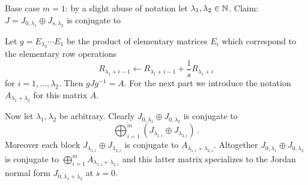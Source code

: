 \documentclass[draft]{article}
\begin{document}
\begin{itemize}
    \begin{remark}
        Base case $m = 1$: by a slight abuse of notation let $\lambda_1, \lambda_2 \in \mathbb N$. Claim: $J=J_{0,\lambda_1} \oplus J_{s,\lambda_2}$ is conjugate to 
        
\begin{comment}
\[
        A = \begin{bNiceArray}{ccc|ccc}[columns-width = auto,first-row,last-col,code-for-first-row = \color{blue}\scriptstyle\rotate,code-for-last-col = \color{blue}\scriptstyle,nullify-dots,xdots/line-style=loosely dotted]
        1 & \Cdots & \lambda_1 & \lambda_1 + 1 & \Cdots & \lambda_1 + \lambda_2 \\
        0 & 1 & 0 & 0 & 0 & 0 & 1\\
        0 & \Ddots & 1 & 0 & 0 & 0 & \Vdots \\
        0 & 0 & 0 & 1 & 0 & 0 & \lambda_1 \\
        \hline
         & & & s & 1 & 0 & \lambda_1 + 1 \\
         & & & 0 & \Ddots & 1 & \Vdots \\
         & & & 0 & 0 & s & \lambda_1 + \lambda_2 
        \end{bNiceArray} 
\]
\end{comment}
Let $g = E_{\lambda_2}\cdots E_1$ be the product of elementary matrices $E_i$ which correspond to the elementary row operations 
$$R_{\lambda_1 + i - 1} \leftarrow R_{\lambda_1 + i-1} + \frac 1s R_{\lambda_1 + i}$$ 
for $i = 1,\dots,\lambda_2$. Then $gJg^{-1} = A$. For the next part we introduce the notation $A_{\lambda_1+\lambda_2}$ for this matrix $A$. 

Now let $\lambda_1,\lambda_2$ be arbitrary. Clearly $J_{0,\lambda_1} \oplus J_{0,\lambda_2}$ is conjugate to 
$$\bigoplus_{i=1}^m (J_{\lambda_{1,i}}\oplus J_{\lambda_{2,i}})\,.$$ 
Moreover each block $J_{\lambda_{1,i}}\oplus J_{\lambda_{2,i}}$ is conjugate to $A_{\lambda_{1,i}+\lambda_{2,i}}$. Altogether $J_{0,\lambda_1} \oplus J_{0,\lambda_2}$ is conjugate to $\bigoplus_{i = 1}^m A_{\lambda_{1,i}+\lambda_{2,i}}$ and this latter matrix specializes to the Jordan normal form $J_{0,\lambda_1 + \lambda_2}$ at $s=0$.


\end{remark}
\end{itemize}
\end{document}
